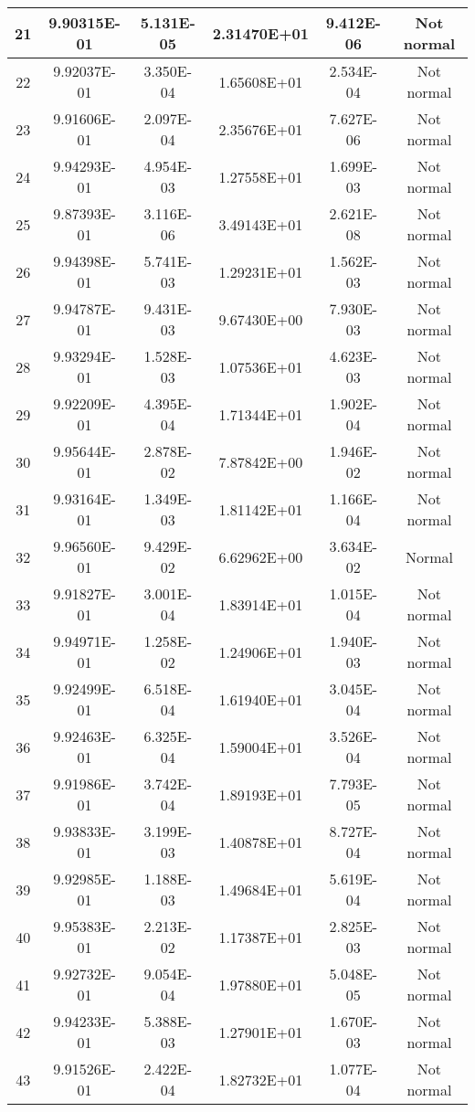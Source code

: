 \begin{table}[h]
\begin{tabular}{|c|c|c|c|c|c|}
		21 & 9.90315E-01 & 5.131E-05 & 2.31470E+01 & 9.412E-06 & Not normal\\\hline
		22 & 9.92037E-01 & 3.350E-04 & 1.65608E+01 & 2.534E-04 & Not normal\\\hline
		23 & 9.91606E-01 & 2.097E-04 & 2.35676E+01 & 7.627E-06 & Not normal\\\hline
		24 & 9.94293E-01 & 4.954E-03 & 1.27558E+01 & 1.699E-03 & Not normal\\\hline
		25 & 9.87393E-01 & 3.116E-06 & 3.49143E+01 & 2.621E-08 & Not normal\\\hline
		26 & 9.94398E-01 & 5.741E-03 & 1.29231E+01 & 1.562E-03 & Not normal\\\hline
		27 & 9.94787E-01 & 9.431E-03 & 9.67430E+00 & 7.930E-03 & Not normal\\\hline
		28 & 9.93294E-01 & 1.528E-03 & 1.07536E+01 & 4.623E-03 & Not normal\\\hline
		29 & 9.92209E-01 & 4.395E-04 & 1.71344E+01 & 1.902E-04 & Not normal\\\hline
		30 & 9.95644E-01 & 2.878E-02 & 7.87842E+00 & 1.946E-02 & Not normal\\\hline
		31 & 9.93164E-01 & 1.349E-03 & 1.81142E+01 & 1.166E-04 & Not normal\\\hline
		32 & 9.96560E-01 & 9.429E-02 & 6.62962E+00 & 3.634E-02 & Normal\\\hline
		33 & 9.91827E-01 & 3.001E-04 & 1.83914E+01 & 1.015E-04 & Not normal\\\hline
		34 & 9.94971E-01 & 1.258E-02 & 1.24906E+01 & 1.940E-03 & Not normal\\\hline
		35 & 9.92499E-01 & 6.518E-04 & 1.61940E+01 & 3.045E-04 & Not normal\\\hline
		36 & 9.92463E-01 & 6.325E-04 & 1.59004E+01 & 3.526E-04 & Not normal\\\hline
		37 & 9.91986E-01 & 3.742E-04 & 1.89193E+01 & 7.793E-05 & Not normal\\\hline
		38 & 9.93833E-01 & 3.199E-03 & 1.40878E+01 & 8.727E-04 & Not normal\\\hline
		39 & 9.92985E-01 & 1.188E-03 & 1.49684E+01 & 5.619E-04 & Not normal\\\hline
		40 & 9.95383E-01 & 2.213E-02 & 1.17387E+01 & 2.825E-03 & Not normal\\\hline
		41 & 9.92732E-01 & 9.054E-04 & 1.97880E+01 & 5.048E-05 & Not normal\\\hline
		42 & 9.94233E-01 & 5.388E-03 & 1.27901E+01 & 1.670E-03 & Not normal\\\hline
		43 & 9.91526E-01 & 2.422E-04 & 1.82732E+01 & 1.077E-04 & Not normal\\\hline

\end{tabular}
\end{table}
